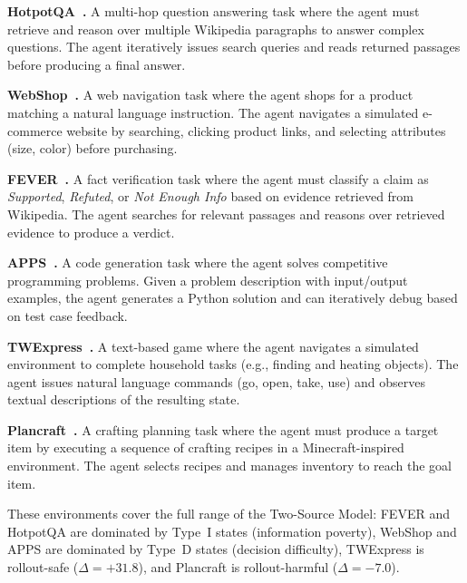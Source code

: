 \textbf{HotpotQA~\cite{yang2018hotpotqa}.}
A multi-hop question answering task where the agent must retrieve
and reason over multiple Wikipedia paragraphs to answer complex
questions. The agent iteratively issues search queries and reads
returned passages before producing a final answer.

\textbf{WebShop~\cite{yao2022webshop}.}
A web navigation task where the agent shops for a product matching
a natural language instruction. The agent navigates a simulated
e-commerce website by searching, clicking product links, and
selecting attributes (size, color) before purchasing.

\textbf{FEVER~\cite{thorne2018fever}.}
A fact verification task where the agent must classify a claim as
\emph{Supported}, \emph{Refuted}, or \emph{Not Enough Info} based
on evidence retrieved from Wikipedia. The agent searches for
relevant passages and reasons over retrieved evidence to produce
a verdict.

\textbf{APPS~\cite{hendrycks2021apps}.}
A code generation task where the agent solves competitive
programming problems. Given a problem description with input/output
examples, the agent generates a Python solution and can iteratively
debug based on test case feedback.

\textbf{TWExpress~\cite{jansen2023twexpress}.}
A text-based game where the agent navigates a simulated environment
to complete household tasks (e.g., finding and heating objects).
The agent issues natural language commands (go, open, take, use)
and observes textual descriptions of the resulting state.

\textbf{Plancraft~\cite{dagan2024plancraft}.}
A crafting planning task where the agent must produce a target item
by executing a sequence of crafting recipes in a Minecraft-inspired
environment. The agent selects recipes and manages inventory to
reach the goal item.

These environments cover the full range of the Two-Source Model:
FEVER and HotpotQA are dominated by Type~I states (information
poverty), WebShop and APPS are dominated by Type~D states
(decision difficulty), TWExpress is rollout-safe
($\Delta{=}{+}31.8$), and Plancraft is rollout-harmful
($\Delta{=}{-}7.0$).

